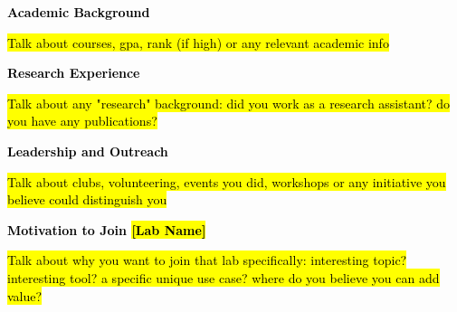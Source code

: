 \documentclass[12pt]{article}
\newcommand{\statement}[1]{\medskip\noindent
  \textcolor{black}{\textbf{#1}}\space
}
\begin{document}
\statement{Academic Background} 

\hl{Talk about courses, gpa, rank (if high) or any relevant academic info}

\vspace{0.5cm}
\statement{Research Experience}

\hl{Talk about any "research" background: did you work as a research assistant? do you have any publications?}

\vspace{0.5cm}
\statement{Leadership and Outreach}

\hl{Talk about clubs, volunteering, events you did, workshops or any initiative you believe could distinguish you}

\vspace{0.5cm}
\statement{Motivation to Join \hl{[Lab Name]}}

\hl{Talk about why you want to join that lab specifically: interesting topic? interesting tool? a specific unique use case? where do you believe you can add value?}
\end{document}
